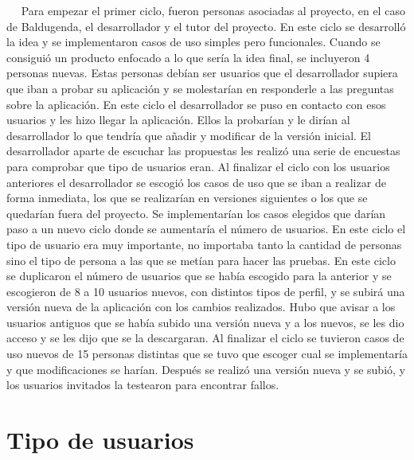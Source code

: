  
Para empezar el primer ciclo, fueron personas asociadas al proyecto, en el caso de Baldugenda, el desarrollador y el tutor del proyecto.
En este ciclo se desarrolló la idea y se implementaron casos de uso simples pero funcionales.
Cuando se consiguió un producto enfocado a lo que sería la idea final, se incluyeron 4 personas nuevas. Estas personas debían ser usuarios que el desarrollador supiera que iban a probar su aplicación y se molestarían en responderle a las preguntas sobre la aplicación. 
En este ciclo el desarrollador se puso en contacto con esos usuarios y les hizo llegar la aplicación. Ellos la probarían y le dirían al desarrollador lo que tendría que añadir y modificar de la versión inicial. El desarrollador aparte de escuchar las propuestas les realizó una serie de encuestas para comprobar que tipo de usuarios eran.
Al finalizar el ciclo con los usuarios anteriores el desarrollador se escogió los casos de uso que se iban a realizar de forma inmediata, los que se realizarían en versiones siguientes o los que se quedarían fuera del proyecto.
Se implementarían los casos elegidos que darían paso a un nuevo ciclo donde se aumentaría el número de usuarios.
En este ciclo el tipo de usuario era muy importante, no importaba tanto la cantidad de personas sino el tipo de persona a las que se metían  para hacer las pruebas.
En este ciclo se duplicaron el número de usuarios que se había escogido para la anterior y se escogieron de 8 a 10 usuarios nuevos, con distintos tipos de perfil, y se subirá una versión nueva de la aplicación con los cambios realizados.
Hubo que avisar a los usuarios antiguos que se había subido una versión nueva y a los nuevos, se les dio acceso y se les dijo que se la descargaran.
Al finalizar el ciclo se tuvieron casos de uso nuevos de 15 personas distintas que se tuvo que escoger cual se implementaría  y que modificaciones se harían.
Después se realizó una versión nueva y se subió, y los usuarios invitados la testearon para encontrar fallos.



\section{Tipo de usuarios}
\label{secc:tipo de usuarios}

